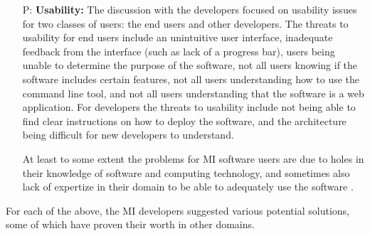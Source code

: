\documentclass[doubleblind,12pt, 3p, times]{elsarticle}
\newcounter{pnum} %
\begin{document}
\begin{enumerate}
\item[P\refstepcounter{pnum}\thepnum \label{P_Usability}:] \textbf{Usability:}
The discussion with the developers focused on usability issues for two classes
of users: the end users and other developers.  The threats to usability for end
users include an unintuitive user interface, inadequate feedback from the
interface (such as lack of a progress bar), users being unable to determine the
purpose of the software, not all users knowing if the software includes certain
features, not all users understanding how to use the command line tool, and not
all users understanding that the software is a web application. For developers
the threats to usability include not being able to find clear instructions on
how to deploy the software, and the architecture being difficult for new
developers to understand.

At least to some extent the problems for MI software users are due to holes in
their knowledge of software and computing technology, and sometimes also
lack of expertize in their domain to be able to adequately use the software
\cite{WieseEtAl2019}. 

\end{enumerate}

For each of the above, the MI developers suggested various potential
solutions, some of which have proven their worth in other domains.
\end{document}
